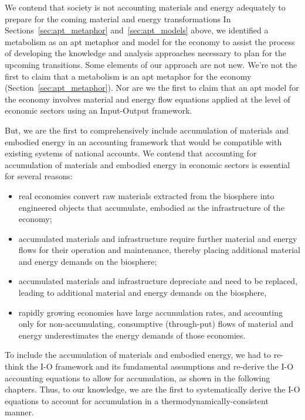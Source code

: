 We contend that society is not accounting materials and energy adequately 
to prepare for the coming material and energy transformations 
In Sections~\ref{sec:apt_metaphor} and~\ref{sec:apt_models} above,
we identified a metabolism as an apt metaphor and model for the economy 
to assist the process of developing the knowledge and analysis approaches
necessary to plan for the upcoming transitions.
Some elements of our approach are not new.
We're not the first to claim that a metabolism is an apt metaphor for the economy
(Section~\ref{sec:apt_metaphor}).\cite{F-K1998, Giampietro2000, Barradas1936, Haberl2001, Daniels2001}
Nor are we the first to claim that an apt model for the economy 
involves material and energy flow equations 
applied at the level of economic sectors using an Input-Output framework.~\cite{G-R1975,
G-R1979a, Lenzen1998, Hendrickson2006}

But, we are the first to comprehensively include accumulation
of materials and embodied energy in an accounting framework
that would be compatible with existing systems of national accounts.
We contend that accounting for accumulation 
of materials and embodied energy in economic sectors is essential
for several reasons:

\begin{itemize}
	\item{real economies convert raw materials extracted from the biosphere
		 	into engineered objects that accumulate,  
			embodied as the infrastructure of the economy;}
	\item{accumulated materials and infrastructure require further material and energy flows
			for their operation and maintenance,
			thereby placing additional material and energy demands on the biosphere;}
	\item{accumulated materials and infrastructure depreciate and need to be replaced,
		 	leading to additional material and energy demands on the biosphere,}
	\item{rapidly growing economies have large accumulation rates, 
			and accounting only for non-accumulating,
			consumptive (through-put) flows of material and energy 
			underestimates the energy demands of those economies.}
\end{itemize}

To include the accumulation of materials and embodied energy, 
we had to re-think the I-O framework and its fundamental assumptions
and re-derive the I-O accounting equations
to allow for accumulation, as shown in the following chapters. 
Thus, to our knowledge, we are the first 
to systematically derive the I-O equations to account for accumulation
in a thermodynamically-consistent manner.

